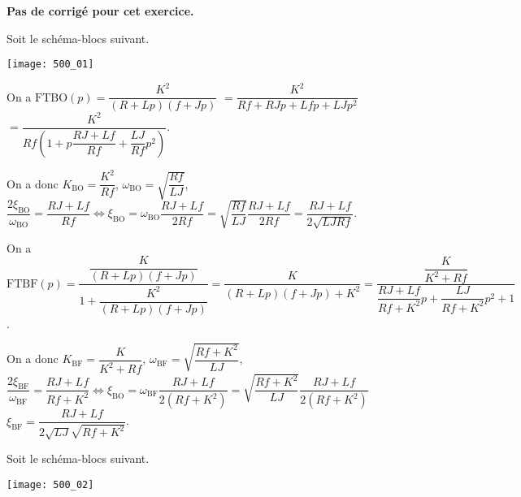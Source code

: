 \normaltrue \difficilefalse \tdifficilefalse
\correctiontrue


\setcounter{numques}{0}

\ifcorrection
\else
\textbf{Pas de corrigé pour cet exercice.}
\fi


\ifprof 
\else
Soit le schéma-blocs suivant.
\begin{center}
\texttt{[image: 500\_01]}
\end{center}
 \fi
 
\ifprof
On a $\text{FTBO}(p)=\dfrac{K^2}{\left(R+Lp\right)\left(f+Jp\right)}$
$=\dfrac{K^2}{Rf+RJp+Lfp+LJp^2}$
$=\dfrac{K^2}{Rf\left(1+p\dfrac{RJ+Lf}{Rf}+\dfrac{LJ}{Rf}p^2\right)}$.

On a donc $K_{\text{BO}}=\dfrac{K^2}{Rf}$, 
$\omega_{\text{BO}} = \sqrt{\dfrac{Rf}{LJ}}$,
$\dfrac{2\xi_{\text{BO}} }{\omega_{\text{BO}}}=\dfrac{RJ+Lf}{Rf} \Leftrightarrow
\xi_{\text{BO}} =\omega_{\text{BO}}\dfrac{RJ+Lf}{2Rf}
=\sqrt{\dfrac{Rf}{LJ}}\dfrac{RJ+Lf}{2Rf}
=\dfrac{RJ+Lf}{2\sqrt{LJRf}}$.
\else 
\fi

\ifprof
On a $\text{FTBF}(p)=\dfrac{\dfrac{K}{\left(R+Lp\right)\left(f+Jp\right)}}{1+\dfrac{K^2}{\left(R+Lp\right)\left(f+Jp\right)}}
=\dfrac{K}{\left(R+Lp\right)\left(f+Jp\right)+K^2}
=\dfrac{\dfrac{K}{K^2+Rf}}{\dfrac{RJ+Lf}{Rf+K^2}p+\dfrac{LJ}{Rf+K^2}p^2+1}$.



On a donc $K_{\text{BF}}=\dfrac{K}{K^2+Rf}$, 
$\omega_{\text{BF}} = \sqrt{\dfrac{Rf+K^2}{LJ}}$,
$\dfrac{2\xi_{\text{BF}} }{\omega_{\text{BF}}}=\dfrac{RJ+Lf}{Rf+K^2} \Leftrightarrow
\xi_{\text{BO}} =\omega_{\text{BF}}\dfrac{RJ+Lf}{2\left(Rf+K^2\right)}
=\sqrt{\dfrac{Rf+K^2}{LJ}}\dfrac{RJ+Lf}{2\left(Rf+K^2\right)}$
%
$\xi_{\text{BF}}=\dfrac{RJ+Lf}{2\sqrt{LJ}\sqrt{Rf+K^2}}$.
\else 
\fi

\ifprof 
\else
Soit le schéma-blocs suivant.
\begin{center}
\texttt{[image: 500\_02]}
\end{center}
 \fi
 
